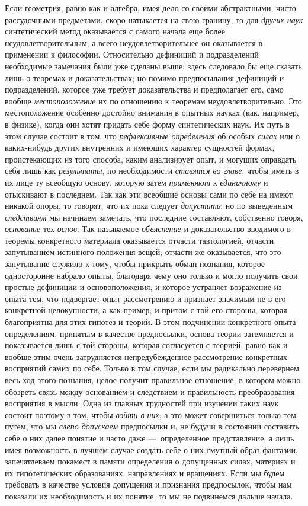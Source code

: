 \documentclass[twoside]{article}
\begin{document}
Если геометрия, равно как и алгебра, имея дело со своими
абстрактными, чисто рассудочными предметами, скоро натыкается на свою
границу, то для {\em других наук}
синтетический метод оказывается с самого начала еще более
неудовлетворительным, а всего неудовлетворительнее он оказывается в
применении к философии. Относительно дефиниций и подразделений необходимые
замечания были уже сделаны выше; здесь следовало бы еще сказать лишь о
теоремах и доказательствах; но помимо предпосылания дефиниций и
подразделений, которое уже требует доказательства и предполагает его, само
вообще {\em местоположение}
их по отношению к теоремам неудовлетворительно. Это
местоположение особенно достойно внимания в опытных науках (как, например,
в физике), когда они хотят придать себе форму синтетических наук. Их путь в
этом случае состоит в том, что
{\em рефлексивные определения}
об особых {\em силах}
или о каких-нибудь других внутренних и имеющих характер
сущностей формах, проистекающих из того способа, каким анализирует опыт, и
могущих оправдать себя лишь как
{\em результаты}, по
необходимости {\em ставятся во главе},
чтобы иметь в их лице ту всеобщую основу, которую затем
{\em применяют} к
{\em единичному} и
отыскивают в последнем. Так как эти всеобщие основы сами по себе на имеют
никакой опоры, то говорят, что их пока следует
{\em допустить}; но по
выведенным {\em следствиям}
мы начинаем замечать, что последние составляют,
собственно говоря,
{\em основание} тех
{\em основ}. Так
называемое {\em объяснение}
и доказательство вводимого в теоремы конкретного материала
оказывается отчасти тавтологией, отчасти запутыванием истинного положения
вещей; отчасти же оказывается, что это запутывание служило к тому, чтобы
прикрыть обман познания, которое односторонне набрало опыты, благодаря чему
оно только и могло получить свои простые дефиниции и основоположения, и
которое устраняет возражение из опыта тем, что подвергает опыт рассмотрению
и признает значимым не в его конкретной целокупности, а как пример, и
притом с той его стороны, которая благоприятна для этих гипотез и теорий. В
этом подчинении конкретного опыта определениям, принятым в качестве
предпосылки, основа теории затемняется и показывается лишь с той стороны,
которая согласуется с теорией, равно как и вообще этим очень затрудняется
непредубежденное рассмотрение конкретных восприятий самих по себе. Только в
том случае, если мы радикально перевернем весь ход этого познания, целое
получит правильное отношение, в котором можно обозреть связь между
основанием и следствием и правильность преобразования восприятия в мысли.
Одна из главных трудностей при изучении таких наук состоит поэтому в том,
чтобы {\em войти в них};
а это может совершиться только тем путем, что мы
{\em слепо допускаем}
предпосылки и, не будучи в состоянии составить себе о них
далее понятие и часто даже —~определенное представление, а
лишь имея возможность в лучшем случае создать себе о них смутный образ
фантазии, запечатлеваем покамест в памяти определения о допущенных силах,
материях и их гипотетических образованиях, направлениях и вращениях. Если
мы будем требовать в качестве условия допущения и признания предпосылок,
чтобы нам показали их необходимость и их понятие, то мы не подвинемся
дальше начала.
\end{document}
